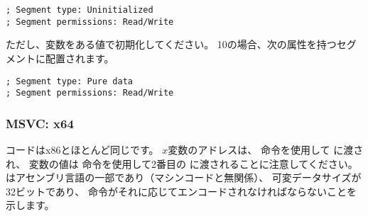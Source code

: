 \begin{lstlisting}
; Segment type: Uninitialized
; Segment permissions: Read/Write
\end{lstlisting}

ただし、変数をある値で初期化してください。 
10の場合、次の属性を持つセグメントに配置されます。

\begin{lstlisting}
; Segment type: Pure data
; Segment permissions: Read/Write
\end{lstlisting}

\subsubsection{MSVC: x64}



コードはx86とほとんど同じです。 
$x$変数のアドレスは、 \LEA 命令を使用して \scanf に渡され、
変数の値は \MOV 命令を使用して2番目の \printf に渡されることに注意してください。 
はアセンブリ言語の一部であり（マシンコードと無関係）、
可変データサイズが32ビットであり、 \MOV 命令がそれに応じてエンコードされなければならないことを示します。
